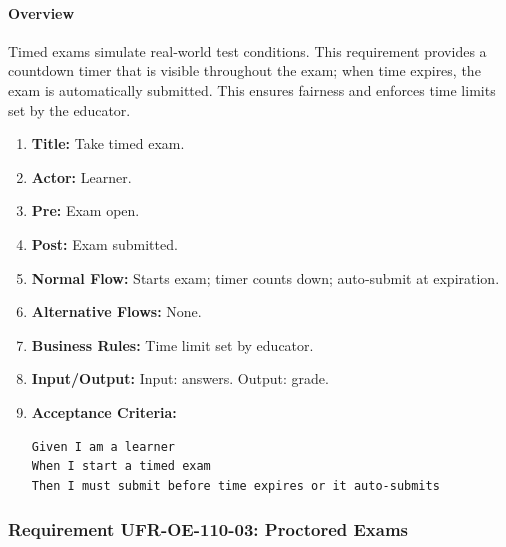\paragraph{Overview}
Timed exams simulate real‑world test conditions. This requirement provides a countdown timer that is visible throughout the exam; when time expires, the exam is automatically submitted. This ensures fairness and enforces time limits set by the educator.
\begin{enumerate}[label=\textbf{\arabic*.}]
\item \textbf{Title:} Take timed exam.
\item \textbf{Actor:} Learner.
\item \textbf{Pre:} Exam open.
\item \textbf{Post:} Exam submitted.
\item \textbf{Normal Flow:} Starts exam; timer counts down; auto‑submit at expiration.
\item \textbf{Alternative Flows:} None.
\item \textbf{Business Rules:} Time limit set by educator.
\item \textbf{Input/Output:} Input: answers. Output: grade.
\item \textbf{Acceptance Criteria:}
    \begin{verbatim}
Given I am a learner
When I start a timed exam
Then I must submit before time expires or it auto-submits
    \end{verbatim}
\end{enumerate}

\subsubsection{Requirement UFR-OE-110-03: Proctored Exams}
